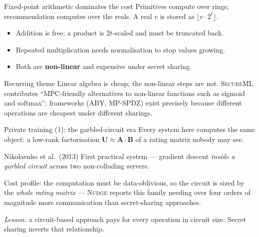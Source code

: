 \documentclass[10pt,aspectratio=169]{beamer}
\newcommand{\sys}[1]{\textsc{#1}\xspace}
\begin{document}
\begin{frame}{Fixed-point arithmetic dominates the cost}
  Primitives compute over rings; recommendation computes over the reals.
  A real $v$ is stored as $\lfloor v\cdot 2^t\rfloor$.
 
  \begin{itemize}
    \item Addition is free; a product is $2t$-scaled and must be \alert{truncated} back.
    \item Repeated multiplication needs \alert{normalisation} to stop values growing.
    \item Both are \textbf{non-linear} and expensive under secret sharing.
  \end{itemize}
 
  \begin{block}{Recurring theme}
    Linear algebra is cheap; the non-linear steps are not.
    \sys{SecureML} contributes ``MPC-friendly alternatives to non-linear functions
    such as sigmoid and softmax''; frameworks (ABY, MP-SPDZ) exist precisely because
    different operations are cheapest under different sharings.
  \end{block}
\end{frame}
 
\begin{frame}{Private training (1): the garbled-circuit era}
  Every system here computes the same object: a low-rank factorisation
  $\mathbf{U}\approx\mathbf{A}\cdot\mathbf{B}$ of a rating matrix nobody may see.
 
  \begin{block}{Nikolaenko et al.\ (2013)}
    First practical system --- gradient descent \emph{inside a garbled circuit}
    across two non-colluding servers.
  \end{block}
 
  \alert{Cost profile:} the computation must be data-oblivious, so the circuit is
  sized by the \emph{whole rating matrix} --- \sys{Nudge} reports this family needing
  over four orders of magnitude more communication than secret-sharing approaches.
 
  \begin{center}\small
  \emph{Lesson:} a circuit-based approach pays for every operation in circuit size.
  Secret sharing inverts that relationship.
  \end{center}
\end{frame}
 
\end{document}
